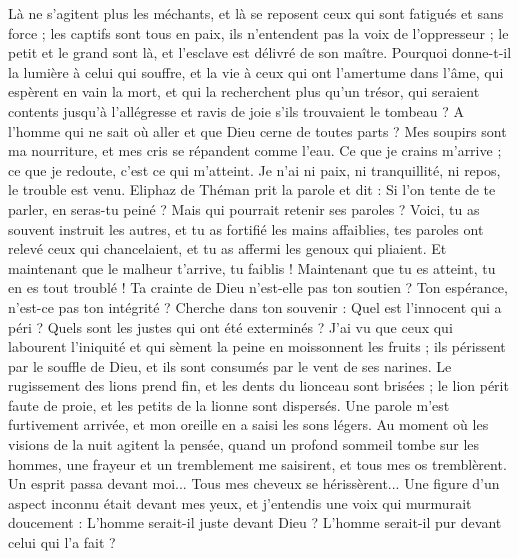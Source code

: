 \begin{multicols}{2}
Là ne s'agitent plus les méchants, et là se reposent ceux qui sont fatigués et sans force ;
les captifs sont tous en paix, ils n'entendent pas la voix de l'oppresseur ;
le petit et le grand sont là, et l'esclave est délivré de son maître.
Pourquoi donne-t-il la lumière à celui qui souffre, et la vie à ceux qui ont l'amertume dans l’âme,
qui espèrent en vain la mort, et qui la recherchent plus qu'un trésor,
qui seraient contents jusqu'à l'allégresse et ravis de joie s'ils trouvaient le tombeau ?
A l'homme qui ne sait où aller et que Dieu cerne de toutes parts ?
Mes soupirs sont ma nourriture, et mes cris se répandent comme l'eau.
Ce que je crains m'arrive ; ce que je redoute, c'est ce qui m'atteint.
Je n'ai ni paix, ni tranquillité, ni repos, le trouble est venu.
\VerseOne{}Eliphaz de Théman prit la parole et dit :
Si l'on tente de te parler, en seras-tu peiné ? Mais qui pourrait retenir ses paroles ?
Voici, tu as souvent instruit les autres, et tu as fortifié les mains affaiblies,
tes paroles ont relevé ceux qui chancelaient, et tu as affermi les genoux qui pliaient.
Et maintenant que le malheur t'arrive, tu faiblis ! Maintenant que tu es atteint, tu en es tout troublé !
Ta crainte de Dieu n'est-elle pas ton soutien ? Ton espérance, n'est-ce pas ton intégrité ?
Cherche dans ton souvenir : Quel est l'innocent qui a péri ? Quels sont les justes qui ont été exterminés ?
J'ai vu que ceux qui labourent l'iniquité et qui sèment la peine en moissonnent les fruits ;
ils périssent par le souffle de Dieu, et ils sont consumés par le vent de ses narines.
Le rugissement des lions prend fin, et les dents du lionceau sont brisées ;
le lion périt faute de proie, et les petits de la lionne sont dispersés.
Une parole m'est furtivement arrivée, et mon oreille en a saisi les sons légers.
Au moment où les visions de la nuit agitent la pensée, quand un profond sommeil tombe sur les hommes,
une frayeur et un tremblement me saisirent, et tous mes os tremblèrent.
Un esprit passa devant moi... Tous mes cheveux se hérissèrent...
Une figure d'un aspect inconnu était devant mes yeux, et j'entendis une voix qui murmurait doucement :
L'homme serait-il juste devant Dieu ? L'homme serait-il pur devant celui qui l'a fait ?

\end{multicols}
